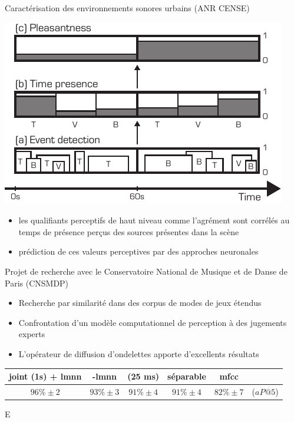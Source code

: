 \begin{frame}{Caractérisation des environnements sonores urbains (ANR CENSE)}
\begin{center}
\includegraphics[width=.4\columnwidth]{figures/block} \\
\end{center}
\begin{itemize}
\item les qualifiants perceptifs de haut niveau comme l'agrément sont corrélés au temps de présence perçus des sources présentes dans la scène
\item prédiction de ces valeurs perceptives par des approches neuronales
\end{itemize}

\end{frame}

\begin{frame}{Projet de recherche avec le Conservatoire National de Musique et de Danse de Paris (CNSMDP)}
\begin{itemize}
\item Recherche par similarité dans des corpus de modes de jeux étendus
\item Confrontation d'un modèle computationnel de perception à des jugements experts
\item L'opérateur de diffusion d'ondelettes apporte d'excellents résultats
\end{itemize}
\begin{table}
\small
    \centering 
    
\begin{tabular}{c|ccccc}
 joint (1s) + lmnn & -lmnn & (25 ms) &  séparable & mfcc & \\
      \hline
 $96\% \pm 2$ & $93\% \pm 3$ & $91\% \pm 4$ & $91\% \pm 4$ & $82\% \pm 7$ & ($aP@5$)\\
\end{tabular}
\end{table}

\end{frame}


E

